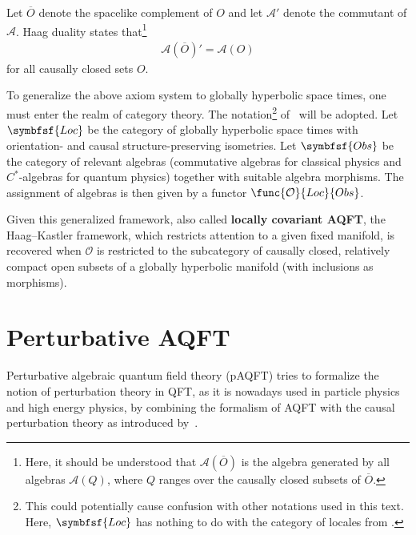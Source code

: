     \begin{axiom}
        Let $\overline{O}$ denote the spacelike complement of $O$ and let $\mathcal{A}'$ denote the commutant of $\mathcal{A}$. Haag duality states that\footnote{Here, it should be understood that $\mathcal{A}(\overline{O})$ is the algebra generated by all algebras $\mathcal{A}(Q)$, where $Q$ ranges over the causally closed subsets of $\overline{O}$.}
        \begin{gather}
            \mathcal{A}(\overline{O})' = \mathcal{A}(O)
        \end{gather}
        for all causally closed sets $O$.
    \end{axiom}

    To generalize the above axiom system to globally hyperbolic space times, one must enter the realm of category theory. The notation\footnote{This could potentially cause confusion with other notations used in this text. Here, $\symbfsf{Loc}$ has nothing to do with the category of locales from .} of~\citet{calaque_mathematical_2015} will be adopted. Let $\symbfsf{Loc}$ be the category of globally hyperbolic space times with orientation- and causal structure-preserving isometries. Let $\symbfsf{Obs}$ be the category of relevant algebras (commutative algebras for classical physics and $C^*$-algebras for quantum physics) together with suitable algebra morphisms. The assignment of algebras is then given by a functor $\func{\mathcal{O}}{Loc}{Obs}$.

    \begin{remark}[LCAQFT]\label{aqft:lcaqft}
        Given this generalized framework, also called \textbf{locally covariant AQFT}, the Haag--Kastler framework, which restricts attention to a given fixed manifold, is recovered when $\mathcal{O}$ is restricted to the subcategory of causally closed, relatively compact open subsets of a globally hyperbolic manifold (with inclusions as morphisms).
    \end{remark}

\section{Perturbative AQFT}

    Perturbative algebraic quantum field theory (pAQFT) tries to formalize the notion of perturbation theory in QFT, as it is nowadays used in particle physics and high energy physics, by combining the formalism of AQFT with the causal perturbation theory as introduced by~\citet{epstein_role_1973}.

